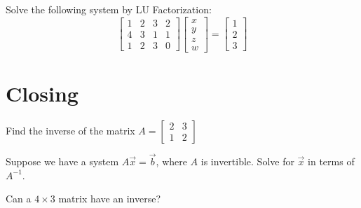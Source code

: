 \documentclass[11pt]{exam}
\begin{document}
    \begin{questions}
        \item Solve the following system by LU Factorization:
        $$\begin{bmatrix} 1 & 2 & 3 & 2 \\ 4 & 3 & 1 & 1 \\ 1 & 2 & 3 & 0 \end{bmatrix}
          \begin{bmatrix} x \\ y \\ z \\ w \end{bmatrix} =
          \begin{bmatrix} 1 \\ 2 \\ 3 \end{bmatrix}$$
    \end{questions}

\pagebreak
\section{Closing}
    \begin{questions}
        \item Find the inverse of the matrix $A = \begin{bmatrix} 2 & 3 \\ 1 & 2 \end{bmatrix}$
        \item Suppose we have a system $A \vec{x} = \vec{b}$, where $A$ is invertible. Solve for $\vec{x}$ in terms of $A^{-1}$.
        \item Can a $4 \times 3$ matrix have an inverse?
    \end{questions}
\end{document}

